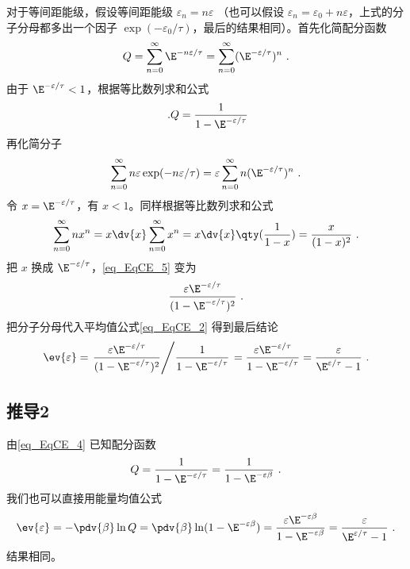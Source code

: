 对于等间距能级，假设等间距能级 $\varepsilon_n = n\varepsilon$ （也可以假设 $\varepsilon_n = \varepsilon_0 + n\varepsilon $，上式的分子分母都多出一个因子 $\exp(-\varepsilon_0/\tau)$，最后的结果相同）。首先化简配分函数
\begin{equation}
Q = \sum_{n = 0}^\infty \E^{-n\varepsilon /\tau}  = \sum_{n = 0}^\infty (\E^{-\varepsilon/\tau})^n~.
\end{equation}
由于 $\E^{-\varepsilon/\tau} < 1$，根据等比数列求和公式 %
\begin{equation}\label{eq_EqCE_4}~.
Q = \frac{1}{1 - \E^{-\varepsilon /\tau}}
\end{equation}
再化简分子
\begin{equation}\label{eq_EqCE_5}
\sum_{n = 0}^\infty  n\varepsilon \exp(-n\varepsilon /\tau)  = \varepsilon \sum_{n = 0}^\infty  n(\E^{-\varepsilon/\tau})^n~.
\end{equation}
令 $x = \E^{-\varepsilon/\tau}$，有 $x < 1$。同样根据等比数列求和公式
\begin{equation}
\sum_{n = 0}^\infty  n x^n = x\dv{x}\sum_{n = 0}^\infty x^n = x\dv{x} \qty(\frac{1}{1 - x}) = \frac{x}{(1 - x)^2}~.
\end{equation}
把 $x$ 换成 $\E^{-\varepsilon/\tau}$，\autoref{eq_EqCE_5} 变为
\begin{equation}
\frac{\varepsilon \E^{-\varepsilon/\tau}}{(1 - \E^{-\varepsilon/\tau})^2}~.
\end{equation}
把分子分母代入平均值公式\autoref{eq_EqCE_2} 得到最后结论
\begin{equation}
\ev{\varepsilon} = \left. \frac{\varepsilon \E^{-\varepsilon/\tau}}{(1 - \E^{-\varepsilon/\tau})^2} \middle/ \frac{1}{1 - \E^{-\varepsilon/\tau}}  \right. = \frac{\varepsilon \E^{-\varepsilon/\tau}}{1 - \E^{-\varepsilon/\tau}} = \frac{\varepsilon}{\E^{\varepsilon/\tau} - 1}~.
\end{equation}

\subsection{推导2}
由\autoref{eq_EqCE_4} 已知配分函数
\begin{equation}
Q = \frac{1}{1 - \E^{-\varepsilon/\tau}} = \frac{1}{1 - \E^{-\varepsilon\beta}}~.
\end{equation}
我们也可以直接用能量均值公式
\begin{equation}
\ev{\varepsilon} = -\pdv{\beta} \ln Q
= \pdv{\beta} \ln (1 - \E^{-\varepsilon\beta}) = \frac{\varepsilon \E^{-\varepsilon\beta}}{1 - \E^{-\varepsilon\beta}} = \frac{\varepsilon}{\E^{\varepsilon /\tau} - 1}~.
\end{equation}
结果相同。
